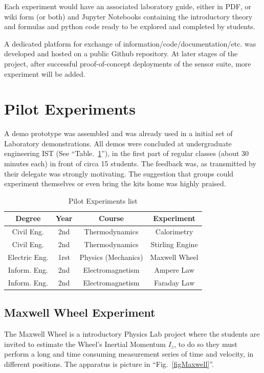 \documentclass[conference]{IEEEtran}
\begin{document}
Each experiment would have an associated laboratory guide, either in PDF, or wiki form (or both) and Jupyter Notebooks containing 
the introductory theory and formulas and python code ready to be explored and completed by students. 

A dedicated platform for exchange of information/code/documentation/etc. was developed and hosted on a public Github\cite{gh} repository. 
At later stages of the project, after successful proof-of-concept deployments of the sensor suite, more experiment will be added.


\section{Pilot Experiments}
A demo prototype was assembled and was already used in a initial set of Laboratory demonstrations. 
All demos were concluded at undergraduate engineering IST (See ``Table.~\ref{tab1}''), 
in the first part of regular classes (about 30 minutes each) in front of circa 15 students.
The feedback was, as transmitted by their delegate was strongly motivating. The suggestion that groups could experiment themselves 
or even bring the kits home was highly praised.

\begin{table}[htbp]
\caption{Pilot Experiments list}
\begin{center}
\begin{tabular}{|c|c|c|c|}
\hline
\textbf{Degree}&\textbf{Year}&\textbf{Course} &\textbf{Experiment}\\
\hline
Civil Eng. & 2nd&  Thermodynamics & Calorimetry\\
\hline
Civil Eng. & 2nd&  Thermodynamics & Stirling Engine\\
\hline
 Electric Eng.& 1rst&  Physics (Mechanics) & Maxwell Wheel\\
\hline
 Inform. Eng.& 2nd & 
    Electromagnetism & Ampere Law\\
\hline
 Inform. Eng.& 2nd & 
    Electromagnetism& Faraday Law\\
\hline
\end{tabular}
\label{tab1}
\end{center}
\end{table}

\subsection{Maxwell Wheel Experiment}
The Maxwell Wheel is a introductory Physics Lab project\cite{b5,b6} where the students are 
invited to estimate the Wheel's Inertial Momentum  $I_z$,
to do so they must perform a long and time consuming measurement series of time and velocity, 
in different positions. 
The apparatus is picture in ``Fig.~\ref{figMaxwell}''.
\end{document}
